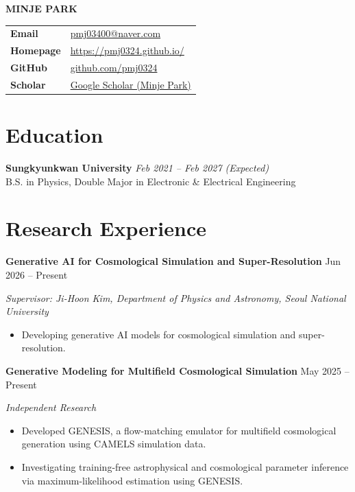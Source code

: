 \documentclass[11pt, a4paper]{article}
\newcommand{\experienceitem}[4]{
    \begin{tcolorbox}[
        colback=lightgray,
        colframe=primary,
        boxrule=0pt,
        leftrule=3pt,
        arc=0pt,
        left=5pt,
        right=5pt,
        top=5pt,
        bottom=5pt
    ]
    \textbf{\large #1} \hfill {\color{primary}#2}

    \textit{#3}

    #4
    \end{tcolorbox}
    \vspace{3pt}
}
\begin{document}
\vspace{-6pt}

{\Huge\bfseries\color{primary} MINJE PARK}

\vspace{4pt}
\noindent
\begin{tabularx}{\textwidth}{@{}>{\bfseries}p{}X@{}}
Email &
\href{mailto:pmj03400@naver.com}{pmj03400@naver.com} \\
Homepage &
\href{https://pmj0324.github.io/}{https://pmj0324.github.io/} \\
GitHub &
\href{https://github.com/pmj0324}{github.com/pmj0324} \\
Scholar &
\href{https://scholar.google.com/citations?user=oC5mE0AAAAAJ}{Google Scholar (Minje Park)} \\
\end{tabularx}

\vspace{2pt}

\section{Education}

\noindent
\textbf{Sungkyunkwan University} \hfill \textit{Feb 2021 -- Feb 2027 (Expected)} \\[2pt]
B.S. in Physics, Double Major in Electronic \& Electrical Engineering

\section{Research Experience}

\experienceitem{Generative AI for Cosmological Simulation and Super-Resolution}{Jun 2026 -- Present}{Supervisor: Ji-Hoon Kim, Department of Physics and Astronomy, Seoul National University}{
    \begin{itemize}[leftmargin=*, itemsep=2pt]
        \item Developing generative AI models for cosmological simulation and super-resolution.
    \end{itemize}
}

\experienceitem{Generative Modeling for Multifield Cosmological Simulation}{May 2025 -- Present}{Independent Research}{
    \begin{itemize}[leftmargin=*, itemsep=2pt]
        \item Developed GENESIS, a flow-matching emulator for multifield cosmological generation using CAMELS simulation data.
        \item Investigating training-free astrophysical and cosmological parameter inference via maximum-likelihood estimation using GENESIS.
    \end{itemize}
}
\end{document}

